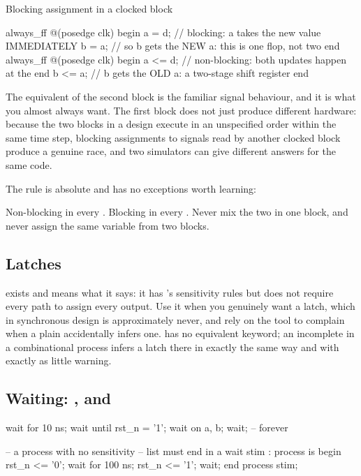 \begin{gotcha}{Blocking assignment in a clocked block}
\begin{svcode}
always_ff @(posedge clk) begin
  a = d;        // blocking: a takes the new value IMMEDIATELY
  b = a;        // so b gets the NEW a: this is one flop, not two
end
always_ff @(posedge clk) begin
  a <= d;       // non-blocking: both updates happen at the end
  b <= a;       // b gets the OLD a: a two-stage shift register
end
\end{svcode}
The \VHDL{} equivalent of the second block is the familiar signal behaviour,
and it is what you almost always want. The first block does not just produce
different hardware: because the two  blocks in a design execute in
an unspecified order within the same time step, blocking assignments to
signals read by another clocked block produce a genuine race, and two
simulators can give different answers for the same code.

The rule is absolute and has no exceptions worth learning:
\begin{ruleofthumb}
Non-blocking \code{<=} in every . Blocking \code{=} in every
. Never mix the two in one block, and never assign the same
variable from two blocks.
\end{ruleofthumb}
\end{gotcha}

\subsection{Latches}

 exists and means what it says: it has
's sensitivity rules but does not require every path to
assign every output. Use it when you genuinely want a latch, which in
synchronous design is approximately never, and rely on the tool to complain
when a plain  accidentally infers one. \VHDL{} has no
equivalent keyword; an incomplete  in a combinational process infers
a latch there in exactly the same way and with exactly as little warning.

\subsection{Waiting: ,  and \code{\#}}

\begin{rosetta}
\begin{rleft}
wait for 10 ns;
wait until rst_n = '1';
wait on a, b;
wait;                 -- forever

-- a process with no sensitivity
-- list must end in a wait
stim : process is
begin
  rst_n <= '0';
  wait for 100 ns;
  rst_n <= '1';
  wait;
end process stim;
\end{rleft}
\end{rosetta}

